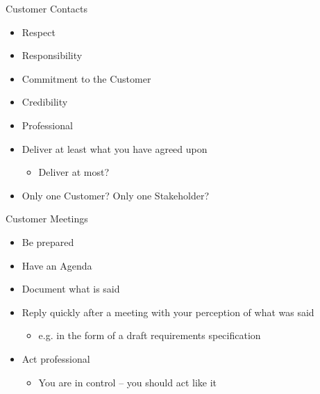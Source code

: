 \documentclass[10pt,t,a4paper]{beamer}
\begin{document}
\begin{frame}[shrink=15,label=sec-1-14]{Customer Contacts}
\begin{itemize}
\item Respect
\item Responsibility
\item Commitment to the Customer
\item Credibility
\item Professional
\item Deliver at least what you have agreed upon
\begin{itemize}
\item Deliver at most?
\end{itemize}
\item Only one Customer? Only one Stakeholder?
\end{itemize}
\begin{block}{Customer Meetings}
\begin{itemize}
\item Be prepared
\item Have an Agenda
\item Document what is said
\item Reply quickly after a meeting with your perception of what was said
\begin{itemize}
\item e.g. in the form of a draft requirements specification
\end{itemize}
\item Act professional
\begin{itemize}
\item You are in control -- you should act like it
\end{itemize}
\end{itemize}
\end{block}
\end{frame}
\end{document}
